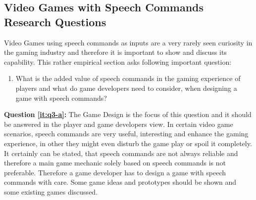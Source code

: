 \subsection{Video Games with Speech Commands Research Questions}
Video Games using speech commands as inputs are a very rarely seen curiosity in the gaming industry and therefore it is important to show and discuss its capability. This rather empirical section asks following important question:

\begin{enumerate}[label={Q.3.\alph*)}, leftmargin=1.75cm]
    \item What is the added value of speech commands in the gaming experience of players and what do game developers need to consider, when designing a game with speech commands?
    \label{it:q3-a}
    
\end{enumerate}
\noindent
\textbf{Question \ref{it:q3-a}:} The Game Design is the focus of this question and it should be answered in the player and game developers view.
In certain video game scenarios, speech commands are very useful, interesting and enhance the gaming experience, in other they might even disturb the game play or spoil it completely.
It certainly can be stated, that speech commands are not always reliable and therefore a main game mechanic solely based on speech commands is not preferable.
Therefore a game developer has to design a game with speech commands with care.
Some game ideas and prototypes should be shown and some existing games discussed.

